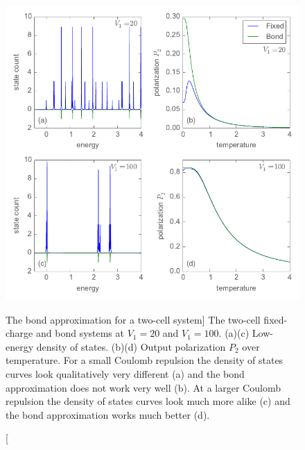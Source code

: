 \begin{figure}
  \center
  \includegraphics{bond_approximation2}
  \caption
  [The bond approximation for a two-cell system]
  {
  \label{fig:bond_approximation2}
  The two-cell fixed-charge and bond systems at $V_1 = 20$ and $V_1 = 100$.
  (a)(c) Low-energy density of states. (b)(d) Output polarization $P_2$ over
  temperature. For a small Coulomb repulsion the density of states curves look
  qualitatively very different (a) and the bond approximation does not work very
  well (b). At a larger Coulomb repulsion the density of states curves look much
  more alike (c) and the bond approximation works much better (d).
  }
\end{figure}

